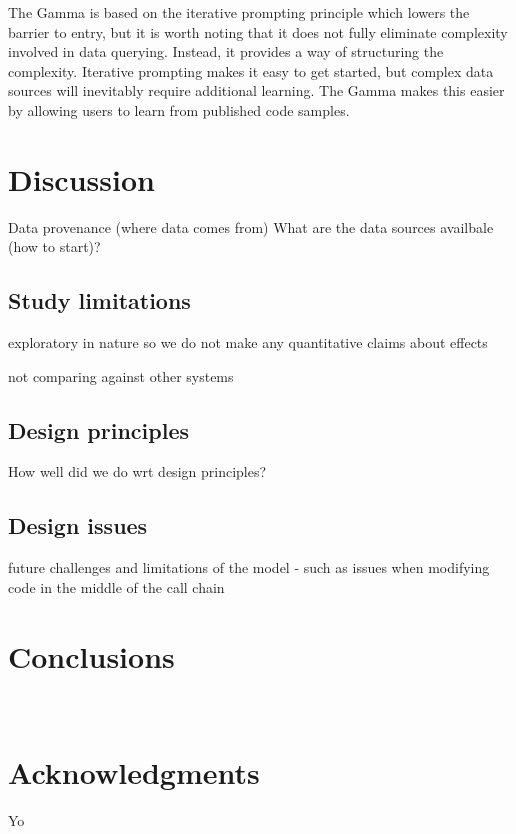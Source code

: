 \documentclass{sigchi}
\begin{document}
The Gamma is based on the iterative prompting principle which lowers the barrier to entry, but
it is worth noting that it does not fully eliminate complexity involved in data querying.
Instead, it provides a way of structuring the complexity. Iterative prompting makes it easy to
get started, but complex data sources will inevitably require additional learning. The Gamma
makes this easier by allowing users to learn from published code samples.
\newpage
~
\newpage


\section{Discussion}

Data provenance (where data comes from)
What are the data sources availbale (how to start)?

\subsection{Study limitations}
exploratory in nature so we do not make any quantitative claims about effects

not comparing against other systems

\subsection{Design principles}
How well did we do wrt design principles?

\subsection{Design issues}
future challenges and limitations of the model - such as issues when modifying code
in the middle of the call chain

\section{Conclusions}

\newpage
~
\newpage

\section{Acknowledgments}
Yo

\balance{}



\end{document}
